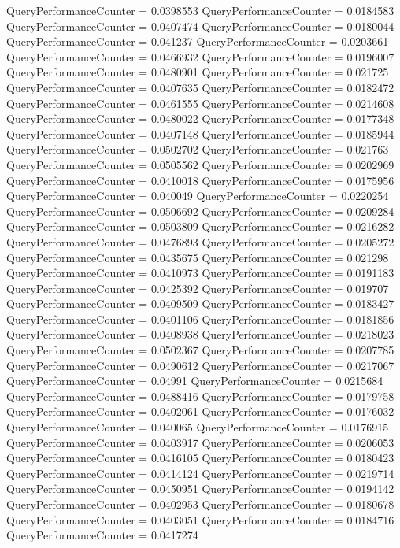 \documentclass[9pt]{article}
\theoremstyle{plain}
\theoremstyle{definition}
\theoremstyle{remark}
\numberwithin{equation}{section}
\begin{document}
QueryPerformanceCounter  =  0.0398553
QueryPerformanceCounter  =  0.0184583
QueryPerformanceCounter  =  0.0407474
QueryPerformanceCounter  =  0.0180044
QueryPerformanceCounter  =  0.041237
QueryPerformanceCounter  =  0.0203661
QueryPerformanceCounter  =  0.0466932
QueryPerformanceCounter  =  0.0196007
QueryPerformanceCounter  =  0.0480901
QueryPerformanceCounter  =  0.021725
QueryPerformanceCounter  =  0.0407635
QueryPerformanceCounter  =  0.0182472
QueryPerformanceCounter  =  0.0461555
QueryPerformanceCounter  =  0.0214608
QueryPerformanceCounter  =  0.0480022
QueryPerformanceCounter  =  0.0177348
QueryPerformanceCounter  =  0.0407148
QueryPerformanceCounter  =  0.0185944
QueryPerformanceCounter  =  0.0502702
QueryPerformanceCounter  =  0.021763
QueryPerformanceCounter  =  0.0505562
QueryPerformanceCounter  =  0.0202969
QueryPerformanceCounter  =  0.0410018
QueryPerformanceCounter  =  0.0175956
QueryPerformanceCounter  =  0.040049
QueryPerformanceCounter  =  0.0220254
QueryPerformanceCounter  =  0.0506692
QueryPerformanceCounter  =  0.0209284
QueryPerformanceCounter  =  0.0503809
QueryPerformanceCounter  =  0.0216282
QueryPerformanceCounter  =  0.0476893
QueryPerformanceCounter  =  0.0205272
QueryPerformanceCounter  =  0.0435675
QueryPerformanceCounter  =  0.021298
QueryPerformanceCounter  =  0.0410973
QueryPerformanceCounter  =  0.0191183
QueryPerformanceCounter  =  0.0425392
QueryPerformanceCounter  =  0.019707
QueryPerformanceCounter  =  0.0409509
QueryPerformanceCounter  =  0.0183427
QueryPerformanceCounter  =  0.0401106
QueryPerformanceCounter  =  0.0181856
QueryPerformanceCounter  =  0.0408938
QueryPerformanceCounter  =  0.0218023
QueryPerformanceCounter  =  0.0502367
QueryPerformanceCounter  =  0.0207785
QueryPerformanceCounter  =  0.0490612
QueryPerformanceCounter  =  0.0217067
QueryPerformanceCounter  =  0.04991
QueryPerformanceCounter  =  0.0215684
QueryPerformanceCounter  =  0.0488416
QueryPerformanceCounter  =  0.0179758
QueryPerformanceCounter  =  0.0402061
QueryPerformanceCounter  =  0.0176032
QueryPerformanceCounter  =  0.040065
QueryPerformanceCounter  =  0.0176915
QueryPerformanceCounter  =  0.0403917
QueryPerformanceCounter  =  0.0206053
QueryPerformanceCounter  =  0.0416105
QueryPerformanceCounter  =  0.0180423
QueryPerformanceCounter  =  0.0414124
QueryPerformanceCounter  =  0.0219714
QueryPerformanceCounter  =  0.0450951
QueryPerformanceCounter  =  0.0194142
QueryPerformanceCounter  =  0.0402953
QueryPerformanceCounter  =  0.0180678
QueryPerformanceCounter  =  0.0403051
QueryPerformanceCounter  =  0.0184716
QueryPerformanceCounter  =  0.0417274
\end{document}
